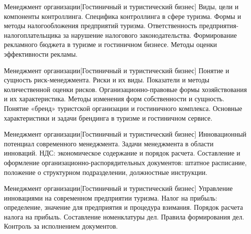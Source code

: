 \documentclass[
	11pt,
	a4paper,
	]
	{article}
\begin{document}
\begin{minipage}[t][\miniH]{\miniL}\centering
	 {Менеджмент организации}[Гостиничный и туристический бизнес]
		{
			Виды, цели и компоненты контроллинга. Специфика контроллинга в сфере туризма.
		}{
			Формы и методы налогообложения предприятий туризма. Ответственность предприятия- налогоплательщика за нарушение налогового законодательства.
		}{
			Формирование рекламного бюджета в туризме и гостиничном бизнесе. Методы оценки эффективности рекламы.
		}
	\lowGE
\end{minipage}

\vfill



\begin{minipage}[t][\miniH]{\miniL}\centering
	 {Менеджмент организации}[Гостиничный и туристический бизнес]
		{
			Понятие и сущность риск-менеджмента. Риски и их виды. Показатели и методы количественной оценки рисков.
		}{
			Организационно-правовые формы хозяйствования и их характеристика. Методы изменения форм собственности и сущность.
		}{
			Понятие «бренд» туристской организации и гостиничного комплекса. Основные характеристики и задачи брендинга в туризме и гостиничном сервисе.
		}
	\lowGE
\end{minipage}

\vfill



\begin{minipage}[t][\miniH]{\miniL}\centering
	 {Менеджмент организации}[Гостиничный и туристический бизнес]
		{
			Инновационный потенциал современного менеджмента. Задачи менеджмента в области инноваций.
		}{
			НДС: экономическое содержание и порядок расчета.
		}{
			Составление и оформление организационно-распорядительных документов: штатное расписание, положение о структурном подразделении, должностные инструкции.
		}
	\lowGE
\end{minipage}





\begin{minipage}[t][\miniH]{\miniL}\centering
	 {Менеджмент организации}[Гостиничный и туристический бизнес]
		{
			Управление инновациями на современном предприятии туризма.
		}{
			Налог на прибыль: определение, значение для предприятия и процедура взимания. Порядок расчета налога на прибыль.
		}{
			Составление номенклатуры дел. Правила формирования дел. Контроль за исполнением документов.
		}
	\lowGE
\end{minipage}
\end{document}
